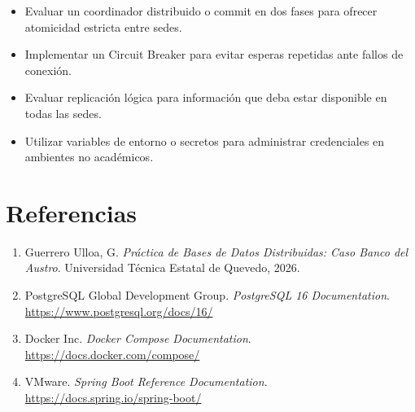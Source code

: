 \documentclass[12pt,a4paper]{article}
\begin{document}
\begin{itemize}
  \item Evaluar un coordinador distribuido o commit en dos fases para ofrecer atomicidad estricta entre sedes.
  \item Implementar un Circuit Breaker para evitar esperas repetidas ante fallos de conexión.
  \item Evaluar replicación lógica para información que deba estar disponible en todas las sedes.
  \item Utilizar variables de entorno o secretos para administrar credenciales en ambientes no académicos.
\end{itemize}

\section{Referencias}

\begin{enumerate}
  \item Guerrero Ulloa, G. \textit{Práctica de Bases de Datos Distribuidas: Caso Banco del Austro}. Universidad Técnica Estatal de Quevedo, 2026.
  \item PostgreSQL Global Development Group. \textit{PostgreSQL 16 Documentation}. \url{https://www.postgresql.org/docs/16/}
  \item Docker Inc. \textit{Docker Compose Documentation}. \url{https://docs.docker.com/compose/}
  \item VMware. \textit{Spring Boot Reference Documentation}. \url{https://docs.spring.io/spring-boot/}
\end{enumerate}
\end{document}
